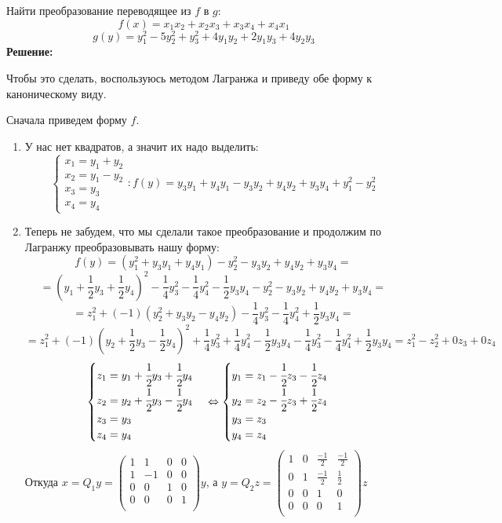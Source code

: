 \documentclass{article}
\begin{document}
Найти преобразование переводящее из $f$ в $g$:
$$f(x) = x_1x_2  +x_2x_3 +  x_3x_4 + x_4x_1$$
$$g(y) = y_1^2 - 5y_2^2  + y_3^2 +4y_1y_2 + 2y_1 y_3 + 4y_2y_3$$
\textbf{Решение:}

Чтобы это сделать, воспользуюсь методом Лагранжа и приведу обе форму к каноническому виду.

Сначала приведем форму $f$. 

\begin{enumerate}
    \item У нас нет квадратов, а значит их надо выделить:
    $$\begin{cases}
        x_1 = y_1 + y_2\\
        x_2  = y_1 - y_2\\
        x_3 = y_3 \\
        x_4 = y_4
    \end{cases}: f(y) = y_3 y_1 + y_4 y_1 - y_3 y_2 + y_4 y_2 + y_3 y_4 + y_1^2 - y_2^2$$
    \item Теперь не забудем, что мы сделали такое преобразование и продолжим по Лагранжу преобразовывать нашу форму:
    $$f(y) = (y_1^2 + y_3y_1 + y_4 y_1) -y_2^2 -y_3y_2+y_4y_2 + y_3y_4 =$$$$= \left(y_1 + \frac{1}{2}y_3 + \frac{1}{2}y_4\right)^2-\frac{1}{4}y_3^2 - \frac{1}{4}y_4^2 - \frac{1}{2}y_3 y_4  -y_2^2 -y_3y_2+y_4y_2 + y_3y_4 =  $$
    $$=z_1^2 +(-1)(y_2^2 +y_3y_2 - y_4y_2)  -\frac{1}{4}y_3^2  -\frac{1}{4}y_4^2 +
\frac{1}{2}y_3y_4=$$$$= z_1^2 + (-1)\left(y_2 + \frac{1}{2}y_3 - \frac{1}{2}y_4\right)^2 + \frac{1}{4}y_3^2 +\frac{1}{4}y_4^2 - \frac{1}{2}y_3y_4-\frac{1}{4}y_3^2  -\frac{1}{4}y_4^2 +
\frac{1}{2}y_3y_4 = z_1^2 - z_2^2 + 0z_3 + 0z_4$$
$$\begin{cases}
    z_1 = y_1 + \cfrac{1}{2}y_3 + \cfrac{1}{2}y_4\\
    z_2 = y_2 + \cfrac{1}{2}y_3 - \cfrac{1}{2}y_4\\
    z_3 = y_3\\
    z_4 = y_4
\end{cases} \Leftrightarrow \begin{cases}
    y_1  = z_1 - \cfrac{1}{2}z_3 - \cfrac{1}{2}z_4\\
    y_2  =z_2 - \cfrac{1}{2}z_3 + \cfrac{1}{2}z_4 \\
    y_3 = z_3 \\
    y_4 = z_4 \\
\end{cases}$$
Откуда $x = Q_1 y = \begin{pmatrix}
    1 & 1 & 0 & 0\\
     1 & -1 & 0 & 0\\
      0 & 0 & 1 & 0\\
       0 & 0 & 0 & 1\\
\end{pmatrix}y$, а $y = Q_2z = \begin{pmatrix}
    1 & 0 & \frac{-1}{2} & \frac{-1}{2}\\
       0 & 1 & \frac{-1}{2} &\frac{1}{2} \\
       0 & 0 & 1 & 0\\
       0 & 0 & 0 & 1\\
\end{pmatrix}z$
\end{enumerate}
\end{document}
